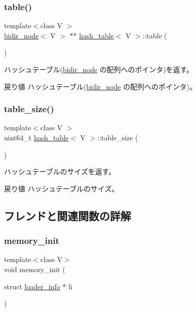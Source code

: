 \subsubsection{\texorpdfstring{table()}{table()}}
{\footnotesize\ttfamily template$<$class V $>$ \\
\hyperlink{classbidir__node}{bidir\+\_\+node}$<$ V $>$ $\ast$$\ast$ \hyperlink{classhash__table}{hash\+\_\+table}$<$ V $>$\+::table (\begin{DoxyParamCaption}{ }\end{DoxyParamCaption})}

ハッシュテーブル(\hyperlink{classbidir__node}{bidir\+\_\+node} の配列へのポインタ)を返す。 \begin{DoxyReturn}{戻り値}
ハッシュテーブル(\hyperlink{classbidir__node}{bidir\+\_\+node} の配列へのポインタ)。 
\end{DoxyReturn}
\hypertarget{classhash__table_a2ae018dc5310c3bf887dec199a445eeb}{}\label{classhash__table_a2ae018dc5310c3bf887dec199a445eeb} 
\subsubsection{\texorpdfstring{table\+\_\+size()}{table\_size()}}
{\footnotesize\ttfamily template$<$class V $>$ \\
uint64\+\_\+t \hyperlink{classhash__table}{hash\+\_\+table}$<$ V $>$\+::table\+\_\+size (\begin{DoxyParamCaption}{ }\end{DoxyParamCaption})}

ハッシュテーブルのサイズを返す。 \begin{DoxyReturn}{戻り値}
ハッシュテーブルのサイズ。 
\end{DoxyReturn}


\subsection{フレンドと関連関数の詳解}
\hypertarget{classhash__table_a8840f01b46a3b9c43a461591a579c1bd}{}\label{classhash__table_a8840f01b46a3b9c43a461591a579c1bd} 
\subsubsection{\texorpdfstring{memory\+\_\+init}{memory\_init}}
{\footnotesize\ttfamily template$<$class V$>$ \\
void memory\+\_\+init (\begin{DoxyParamCaption}\item[{struct \hyperlink{structloader__info}{loader\+\_\+info} $\ast$}]{li }\end{DoxyParamCaption})\hspace{0.3cm}{\ttfamily [friend]}}

